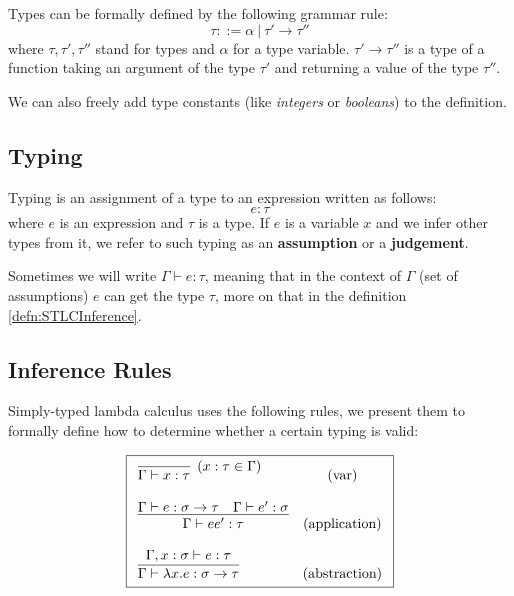 \begin{defn}
    \label{defn:typeSTLC}
    Types can be formally defined by the following grammar rule:
    $$\tau ::= \alpha\ |\ \tau' \rightarrow \tau''$$
    where $\tau, \tau', \tau''$ stand for types and $\alpha$ for a type variable. $\tau' \rightarrow \tau''$ is a type of a function taking an argument of the type $\tau'$ and returning a value of the type $\tau''$.
\end{defn}

We can also freely add type constants (like \emph{integers} or \emph{booleans}) to the definition.

\subsection{Typing}

\begin{defn}
    \label{defn:typingSTLC}
    Typing is an assignment of a type to an expression written as follows:
    $$e : \tau$$
    where $e$ is an expression and $\tau$ is a type. If $e$ is a variable $x$ and we infer other types from it, we refer to such typing as an \textbf{assumption} or a \textbf{judgement}.
\end{defn}

Sometimes we will write $\Gamma \vdash e : \tau$, meaning that in the context of $\Gamma$ (set of assumptions) $e$ can get the type $\tau$, more on that in the definition \ref{defn:STLCInference}.

\subsection{Inference Rules}

Simply-typed lambda calculus uses the following rules, we present them to formally define how to determine whether a certain typing is valid:

\begin{defn}
    \label{defn:STLCInference}
    $$\boxed{\begin{array}{l c}
        \infer[(x : \tau \in \Gamma)]{\Gamma \vdash x : \tau}{} & (\text{var}) \\\\
        \infer{\Gamma \vdash e e' : \tau}{\Gamma \vdash e : \sigma \rightarrow \tau \quad \Gamma \vdash e' : \sigma} & (\text{application}) \\\\
        \infer{\Gamma \vdash \lambda x . e : \sigma \rightarrow \tau}{\Gamma, x : \sigma \vdash e : \tau} & (\text{abstraction})
    \end{array}}$$
\end{defn}

